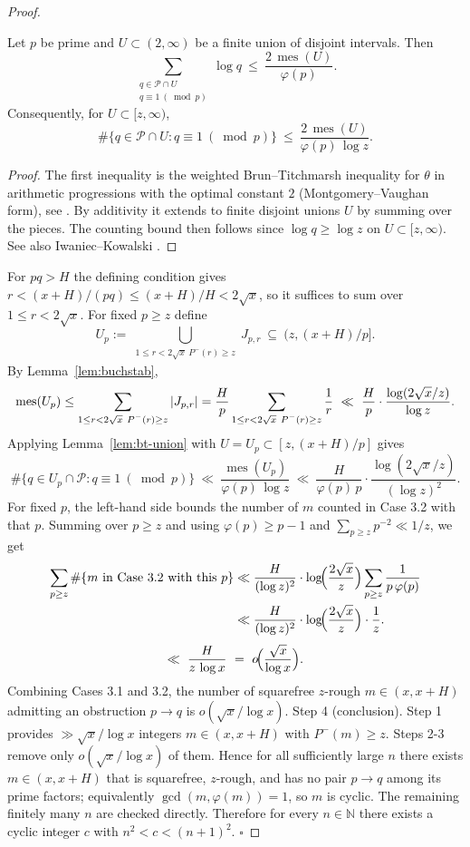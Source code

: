 \begin{proof}
\begin{lemma}\label{lem:bt-union}
Let $p$ be prime and $U\subset(2,\infty)$ be a finite union of disjoint intervals. Then
\[
\sum_{\substack{q\in\mathcal P\cap U\\ q\equiv1\ (\bmod p)}}\log q\ \le\ \frac{2\,\operatorname{mes}(U)}{\varphi(p)}.
\]
Consequently, for $U\subset[z,\infty)$,
\[
\#\{q\in\mathcal P\cap U: q\equiv1\ (\bmod p)\}\ \le\ \frac{2\,\operatorname{mes}(U)}{\varphi(p)\,\log z}.
\]
\end{lemma}
\begin{proof}
The first inequality is the weighted Brun--Titchmarsh inequality for $\theta$ in arithmetic progressions with the optimal constant $2$ (Montgomery--Vaughan form), see \cite[Th.~6.7]{MV2007}. By additivity it extends to finite disjoint unions $U$ by summing over the pieces. The counting bound then follows since $\log q\ge\log z$ on $U\subset[z,\infty)$. See also Iwaniec--Kowalski \cite[Th.~18.11]{IK2004}.
\end{proof}
For $pq>H$ the defining condition gives $r<(x+H)/(pq)\le (x+H)/H<2\sqrt x$, so it suffices to sum over $1\le r<2\sqrt x$. For fixed $p\ge z$ define
\[
U_p:=\bigcup_{\substack{1\le r<2\sqrt x\ P^-(r)\ge z}} J_{p,r} \ \subseteq\ (z, (x+H)/p].
\]
By Lemma~\ref{lem:buchstab},
\[
\operatorname{mes}(U_p)\le \sum_{\substack{1\le r<2\sqrt x\ P^-(r)\ge z}} |J_{p,r}|=\frac{H}{p}\sum_{\substack{1\le r<2\sqrt x\ P^-(r)\ge z}}{1\over r}\ \ll\ \frac{H}{p}\cdot\frac{\log(2\sqrt x/z)}{\log z}.
\]
Applying Lemma~\ref{lem:bt-union} with $U=U_p\subset[z,(x+H)/p]$ gives
\[
\#\{q\in U_p\cap\mathcal P: q\equiv1\ (\bmod p)\}\ \ll\ \frac{\operatorname{mes}(U_p)}{\varphi(p)\,\log z}
\ \ll\ \frac{H}{\varphi(p)\,p}\cdot\frac{\log(2\sqrt x/z)}{(\log z)^2}.
\]
For fixed $p$, the left-hand side bounds the number of $m$ counted in Case 3.2 with that $p$. Summing over $p\ge z$ and using $\varphi(p)\ge p-1$ and $\sum_{p\ge z}p^{-2}\ll 1/z$, we get
\[
\begin{aligned}
\sum_{p\ge z}\#\{m\text{ in Case 3.2 with this }p\} &\ll \frac{H}{(\log z)^2}\cdot\log\!\Bigl(\frac{2\sqrt x}{z}\Bigr)\sum_{p\ge z}\frac{1}{p\,\varphi(p)}\\
&\ll \frac{H}{(\log z)^2}\cdot\log\!\Bigl(\frac{2\sqrt x}{z}\Bigr)\cdot\frac{1}{z}.
\end{aligned}
\]
\[
\ll\ \frac{H}{z\,\log x}\ =\ o\!\Bigl(\frac{\sqrt x}{\log x}\Bigr).
\]
Combining Cases 3.1 and 3.2, the number of squarefree $z$-rough $m\in(x,x+H)$ admitting an obstruction $p\to q$ is $o(\sqrt x/\log x)$.
Step 4 (conclusion). Step 1 provides $\gg \sqrt x/\log x$ integers $m\in(x,x+H)$ with $P^-(m)\ge z$. Steps 2-3 remove only $o(\sqrt x/\log x)$ of them. Hence for all sufficiently large $n$ there exists $m\in(x,x+H)$ that is squarefree, $z$-rough, and has no pair $p\to q$ among its prime factors; equivalently $\gcd(m,\varphi(m))=1$, so $m$ is cyclic. The remaining finitely many $n$ are checked directly. Therefore for every $n\in\mathbb N$ there exists a cyclic integer $c$ with $n^2<c<(n+1)^2$. $\square$
\end{proof}




